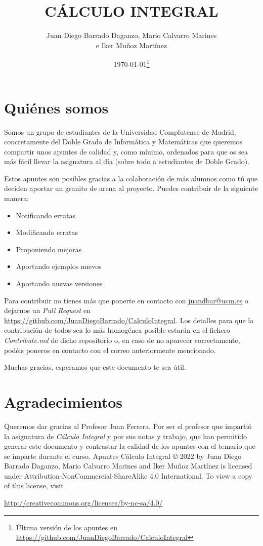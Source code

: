 \documentclass[10pt,a4paper,openright]{book}
\title{\Huge CÁLCULO INTEGRAL}
\author{Juan Diego Barrado Daganzo, Mario Calvarro Marines \\ e Iker Muñoz Martínez}
\date{\today\footnote{Última versión de los apuntes en \url{https://github.com/JuanDiegoBarrado/CalculoIntegral}}}
\theoremstyle{break}
\begin{document}
\maketitle
\frontmatter
\section*{Quiénes somos}
Somos un grupo de estudiantes de la Universidad Complutense de Madrid, concretamente del Doble Grado de Informática y Matemáticas que queremos compartir unos apuntes de calidad y, como mínimo, ordenados para que os sea más fácil llevar la asignatura al día (sobre todo a estudiantes de Doble Grado).

Estos apuntes son posibles gracias a la colaboración de más alumnos como tú que deciden aportar un granito de arena al proyecto. Puedes contribuir de la siguiente manera:
\begin{itemize}
\item Notificando erratas
\item Modificando erratas
\item Proponiendo mejoras
\item Aportando ejemplos nuevos
\item Aportando nuevas versiones
\end{itemize}
Para contribuir no tienes más que ponerte en contacto con \href{mailto:juandbar@ucm.es}{juandbar@ucm.es} o dejarnos un \textit{Pull Request} en \url{https://github.com/JuanDiegoBarrado/CalculoIntegral}. Los detalles para que la contribución de todos sea lo más homogénea posible estarán en el fichero \textit{Contribute.md} de dicho repositorio o, en caso de no aparecer correctamente, podéis poneros en contacto con el correo anteriormente mencionado.

Muchas gracias, esperamos que este documento te sea útil.

\section*{Agradecimientos}
Queremos dar gracias al Profesor Juan Ferrera. Por ser el profesor que impartió la asignatura de \textit{Cálculo Integral} y por sus notas y trabajo, que han permitido generar este documento y contrastar la calidad de los apuntes con el temario que se imparte durante el curso.
\vfill
Apuntes Cálculo Integral © 2022 by Juan Diego Barrado Daganzo, Mario Calvarro Marines and Iker Muñoz Martínez is licensed under Attribution-NonCommercial-ShareAlike 4.0 International. To view a copy of this license, visit
\begin{center}
\url{http://creativecommons.org/licenses/by-nc-sa/4.0/}
\end{center}
\end{document}
